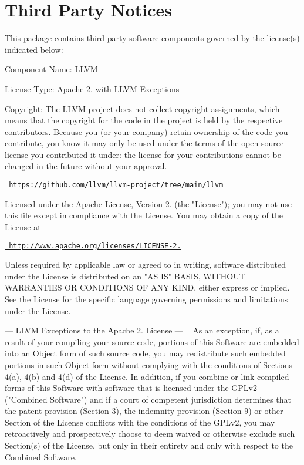 \chapter{Third Party Notices}
\hypertarget{md__hey_tea_9_2_library_2_package_cache_2com_8unity_8burst_0d1_88_87_2_third_01_party_01_notices}{}\label{md__hey_tea_9_2_library_2_package_cache_2com_8unity_8burst_0d1_88_87_2_third_01_party_01_notices}
This package contains third-\/party software components governed by the license(s) indicated below\+:



Component Name\+: LLVM

License Type\+: Apache 2. with LLVM Exceptions

Copyright\+: The LLVM project does not collect copyright assignments, which means that the copyright for the code in the project is held by the respective contributors. Because you (or your company) retain ownership of the code you contribute, you know it may only be used under the terms of the open source license you contributed it under\+: the license for your contributions cannot be changed in the future without your approval.

\href{https://github.com/llvm/llvm-project/tree/main/llvm}{\texttt{ https\+://github.\+com/llvm/llvm-\/project/tree/main/llvm}}

Licensed under the Apache License, Version 2. (the "{}\+License"{}); you may not use this file except in compliance with the License. You may obtain a copy of the License at

\href{http://www.apache.org/licenses/LICENSE-2.0}{\texttt{ http\+://www.\+apache.\+org/licenses/\+LICENSE-\/2.}}

Unless required by applicable law or agreed to in writing, software distributed under the License is distributed on an "{}\+AS IS"{} BASIS, WITHOUT WARRANTIES OR CONDITIONS OF ANY KIND, either express or implied. See the License for the specific language governing permissions and limitations under the License.

--- LLVM Exceptions to the Apache 2. License --- ~\newline
 As an exception, if, as a result of your compiling your source code, portions of this Software are embedded into an Object form of such source code, you may redistribute such embedded portions in such Object form without complying with the conditions of Sections 4(a), 4(b) and 4(d) of the License. In addition, if you combine or link compiled forms of this Software with software that is licensed under the GPLv2 ("{}\+Combined Software"{}) and if a court of competent jurisdiction determines that the patent provision (Section 3), the indemnity provision (Section 9) or other Section of the License conflicts with the conditions of the GPLv2, you may retroactively and prospectively choose to deem waived or otherwise exclude such Section(s) of the License, but only in their entirety and only with respect to the Combined Software.

